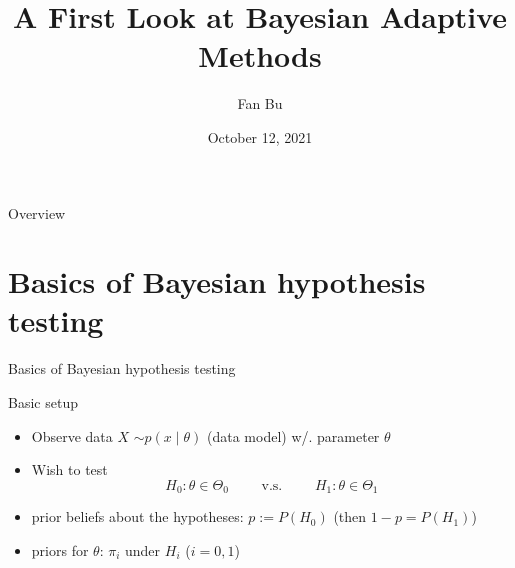 \documentclass[xcolor=dvipsnames]{beamer}
\title[Bayesian Adaptive Methods Review]{A First Look at Bayesian Adaptive Methods}
\subtitle{}
\author[FB] {Fan Bu}
\date{October 12, 2021}
\begin{document}
\begin{frame}
    \titlepage
\end{frame}

\begin{frame}{Overview}
    \tableofcontents
\end{frame}

\section{Basics of Bayesian hypothesis testing}

\begin{frame}
    \Huge{\centerline{Basics of Bayesian hypothesis testing}}
\end{frame}

\begin{frame}{Basic setup}
\begin{itemize}
    \item Observe data $X$  $ \sim p(x \mid \theta)$ (data model) w/. parameter $\theta$
    \item Wish to test 
    \begin{equation*}
     H_0: \theta \in \Theta_0 \qquad \text{ v.s. } \qquad H_1: \theta \in \Theta_1
     \end{equation*}
     \pause
     \item prior beliefs about the hypotheses: $p := P(H_0)$ (then $1-p = P(H_1)$)
     \item priors for $\theta$: $\pi_i$ under $H_i$ ($i=0,1$)
\end{itemize}
    
\end{frame}
\end{document}
